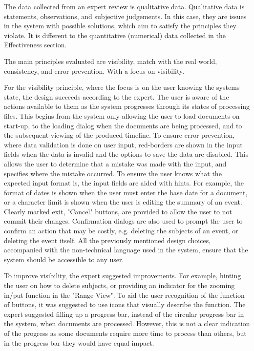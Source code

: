 \par The data collected from an expert review is qualitative data. Qualitative data is statements, observations, and subjective judgements. In this case, they are issues in the system with possible solutions, which aim to satisfy the principles they violate. It is different to the quantitative (numerical) data collected in the Effectiveness section.

\par The main principles evaluated are visibility, match with the real world, consistency, and error prevention. With a focus on visibility.

\par For the visibility principle, where the focus is on the user knowing the systems state, the design succeeds according to the expert. The user is aware of the actions available to them as the system progresses through its states of processing files. This begins from the system only allowing the user to load documents on start-up, to the loading dialog when the documents are being processed, and to the subsequent viewing of the produced timeline. To ensure error prevention, where data validation is done on user input, red-borders are shown in the input fields when the data is invalid and the options to save the data are disabled. This allows the user to determine that a mistake was made with the input, and specifies where the mistake occurred. To ensure the user knows what the expected input format is, the input fields are aided with hints. For example, the format of dates is shown when the user must enter the base date for a document, or a character limit is shown when the user is editing the summary of an event. Clearly marked exit, "Cancel" buttons, are provided to allow the user to not commit their changes. Confirmation dialogs are also used to prompt the user to confirm an action that may be costly, e.g. deleting the subjects of an event, or deleting the event itself. All the previously mentioned design choices, accompanied with the non-technical language used in the system, ensure that the system should be accessible to any user.

\par To improve visibility, the expert suggested improvements. For example, hinting the user on how to delete subjects, or providing an indicator for the zooming in/put function in the "Range View". To aid the user recognition of the function of buttons, it was suggested to use icons that visually describe the function. The expert suggested filling up a progress bar, instead of the circular progress bar in the system, when documents are processed. However, this is not a clear indication of the progress as some documents require more time to process than others, but in the progress bar they would have equal impact.

